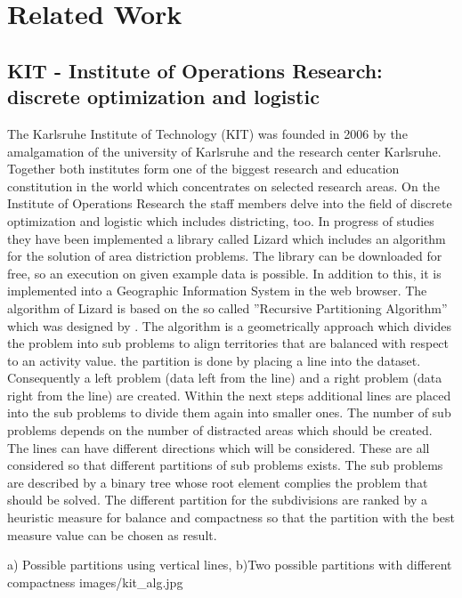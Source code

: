 \section{Related Work}

\subsection{KIT - Institute of Operations Research: discrete optimization and logistic}

The Karlsruhe Institute of Technology (KIT) was founded in 2006 by the amalgamation of the university of Karlsruhe and the research center Karlsruhe. Together both institutes form one of the biggest research and education constitution in the world which concentrates on selected research areas. On the Institute of Operations Research the staff members delve into the field of discrete optimization and logistic which includes districting, too. In progress of studies they have been implemented a library called Lizard which includes an algorithm for the solution of area distriction problems. The library can be downloaded for free, so an execution on given example data is possible. In addition to this, it is implemented into a Geographic Information System in the web browser. The algorithm of Lizard is based on the so called ''Recursive Partitioning Algorithm'' which was designed by \citeauthor{kalcsics}. The algorithm is a geometrically approach which divides the problem into sub problems to align territories that are balanced with respect to an activity value. the partition is done by placing a line into the dataset. Consequently a left problem (data left from the line) and a right problem (data right from the line) are created. Within the next steps additional lines are placed into the sub problems to divide them again into smaller ones. The number of sub problems depends on the number of distracted areas which should be created. The lines can have different directions which will be considered. These are all considered so that different partitions of sub problems exists. The sub problems are described by a binary tree whose root element complies the problem that should be solved. The different partition for the subdivisions are ranked by a heuristic measure for balance and compactness so that the partition with the best measure value can be chosen as result.

\begin{figureOwn}{a) Possible partitions using vertical lines, b)Two possible partitions with different compactness \cite{kalcsics}}{images/kit_alg.jpg}\end{figureOwn}

